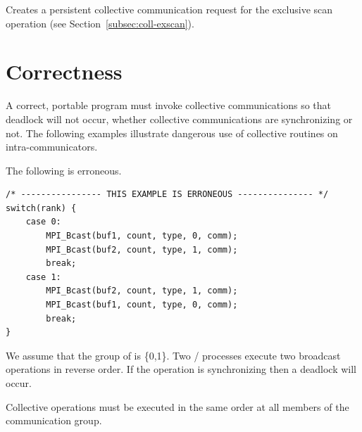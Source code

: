 
Creates a persistent collective communication request for the exclusive scan operation
(see Section~\ref{subsec:coll-exscan}).

\section{Correctness}
\label{coll:correct}

A correct, portable program must invoke collective communications so
that deadlock will
not occur, whether collective communications are synchronizing or not.
The following examples illustrate dangerous use of collective routines
on intra-communicators.

\begin{example}
\label{coll-excorr1}
%
%
The following is erroneous.

\begin{lstlisting}[language={[MPI]C}]
/* ---------------- THIS EXAMPLE IS ERRONEOUS --------------- */
switch(rank) {
    case 0:
        MPI_Bcast(buf1, count, type, 0, comm);
        MPI_Bcast(buf2, count, type, 1, comm);
        break;
    case 1:
        MPI_Bcast(buf2, count, type, 1, comm);
        MPI_Bcast(buf1, count, type, 0, comm);
        break;
}
\end{lstlisting}

We assume that the group of  is \{0,1\}.
Two \MPI/ processes execute two broadcast operations in reverse order.  If
the operation is synchronizing then a deadlock will occur.

Collective
operations must be executed in the same order at all members of the
communication group.
\end{example}


